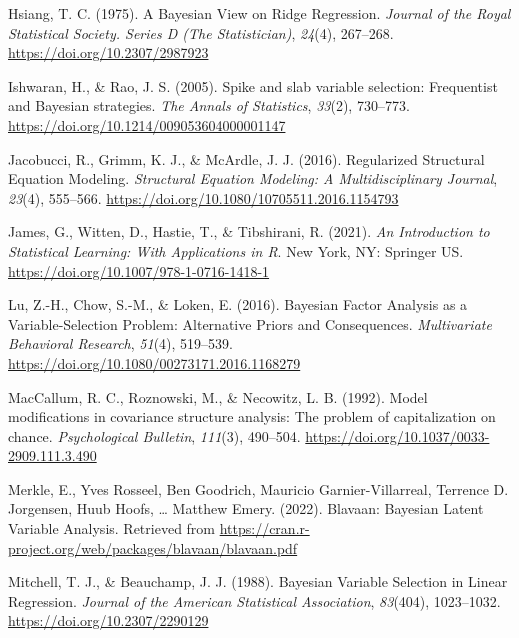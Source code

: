\documentclass[
  man, donotrepeattitle,floatsintext]{apa6}
\newlength{\cslhangindent}
\newlength{\cslentryspacingunit} %
\newenvironment{CSLReferences}[2] %
 {%
  \setlength{\parindent}{0pt}
  \ifodd #1
  \let\oldpar\par
  \def\par{\hangindent=\cslhangindent\oldpar}
  \fi
  \setlength{\parskip}{#2\cslentryspacingunit}
 }%
 {}
\begin{document}
\begin{CSLReferences}{1}{0}
\leavevmode{}%
Hsiang, T. C. (1975). A {Bayesian} {View} on {Ridge} {Regression}. \emph{Journal of the Royal Statistical Society. Series D (The Statistician)}, \emph{24}(4), 267--268. \url{https://doi.org/10.2307/2987923}

\leavevmode{}%
Ishwaran, H., \& Rao, J. S. (2005). Spike and slab variable selection: {Frequentist} and {Bayesian} strategies. \emph{The Annals of Statistics}, \emph{33}(2), 730--773. \url{https://doi.org/10.1214/009053604000001147}

\leavevmode{}%
Jacobucci, R., Grimm, K. J., \& McArdle, J. J. (2016). Regularized {Structural} {Equation} {Modeling}. \emph{Structural Equation Modeling: A Multidisciplinary Journal}, \emph{23}(4), 555--566. \url{https://doi.org/10.1080/10705511.2016.1154793}

\leavevmode{}%
James, G., Witten, D., Hastie, T., \& Tibshirani, R. (2021). \emph{An {Introduction} to {Statistical} {Learning}: With {Applications} in {R}}. New York, NY: Springer US. \url{https://doi.org/10.1007/978-1-0716-1418-1}

\leavevmode{}%
Lu, Z.-H., Chow, S.-M., \& Loken, E. (2016). Bayesian {Factor} {Analysis} as a {Variable}-{Selection} {Problem}: {Alternative} {Priors} and {Consequences}. \emph{Multivariate Behavioral Research}, \emph{51}(4), 519--539. \url{https://doi.org/10.1080/00273171.2016.1168279}

\leavevmode{}%
MacCallum, R. C., Roznowski, M., \& Necowitz, L. B. (1992). Model modifications in covariance structure analysis: The problem of capitalization on chance. \emph{Psychological Bulletin}, \emph{111}(3), 490--504. \url{https://doi.org/10.1037/0033-2909.111.3.490}

\leavevmode{}%
Merkle, E., Yves Rosseel, Ben Goodrich, Mauricio Garnier-Villarreal, Terrence D. Jorgensen, Huub Hoofs, \ldots{} Matthew Emery. (2022). Blavaan: {Bayesian} {Latent} {Variable} {Analysis}. Retrieved from \url{https://cran.r-project.org/web/packages/blavaan/blavaan.pdf}

\leavevmode{}%
Mitchell, T. J., \& Beauchamp, J. J. (1988). Bayesian {Variable} {Selection} in {Linear} {Regression}. \emph{Journal of the American Statistical Association}, \emph{83}(404), 1023--1032. \url{https://doi.org/10.2307/2290129}


\end{CSLReferences}
\end{document}
